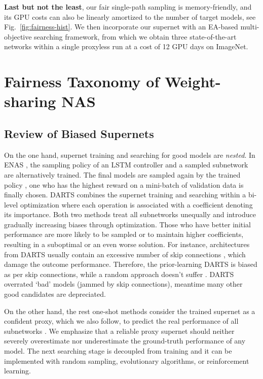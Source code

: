 \documentclass[10pt,twocolumn,letterpaper]{article}
\theoremstyle{definition}
\begin{document}
\textbf{Last but not the least}, our fair single-path sampling is memory-friendly, and its GPU costs can also be linearly amortized to the number of target models, see Fig.~\ref{fig:fairness-hist}.  We then incorporate our supernet with an EA-based multi-objective searching framework, from which we obtain three state-of-the-art networks within a single proxyless run at a cost of 12 GPU days on ImageNet. 




\section{Fairness Taxonomy of Weight-sharing NAS} 


\subsection{Review of Biased Supernets}\label{sec:review-bias}
On the one hand, supernet training and searching for good models are \emph{nested}. In ENAS \cite{pham2018efficient}, the sampling policy  of an LSTM controller \cite{hochreiter1997long} and a sampled subnetwork  are alternatively trained. The final models are sampled again by the trained policy , one who has the highest reward on a mini-batch of validation data is finally chosen. DARTS \cite{liu2018darts} combines the supernet training and searching within a bi-level optimization where each operation is associated with a coefficient denoting its importance. Both two methods treat all subnetworks unequally and introduce gradually increasing biases through optimization. Those who have better initial performance are more likely to be sampled or to maintain higher coefficients, resulting in a suboptimal or an even worse solution. For instance, architectures from DARTS usually contain an excessive number of skip connections \cite{zela2019understanding,liang2019darts+}, which damage the outcome performance. Therefore, the prior-learning DARTS is biased as per skip connections, while a random approach doesn't suffer \cite{li2019random}. DARTS overrated `bad' models (jammed by skip connections), meantime many other good candidates are depreciated.

On the other hand, the rest one-shot methods consider the trained supernet as a confident proxy, which we also follow, to predict the real performance of all subnetworks \cite{brock2017smash,bender2018understanding,guo2019single}. We emphasize that a reliable proxy supernet should neither severely overestimate nor underestimate the ground-truth performance of any model. The next searching stage is decoupled from training and it can be implemented with random sampling, evolutionary algorithms, or reinforcement learning. 
\end{document}
